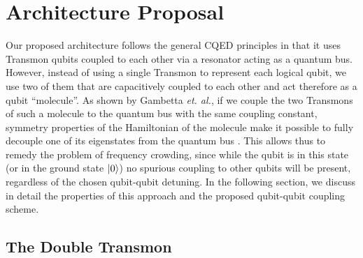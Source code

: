 \section{Architecture Proposal}

Our proposed architecture follows the general CQED principles in that it uses Transmon qubits coupled to each other via a resonator acting as a quantum bus. However, instead of using a single Transmon to represent each logical qubit, we use two of them that are capacitively coupled to each other and act therefore as a qubit ``molecule''. As shown by Gambetta {\it et. al.}, if we couple the two Transmons of such a molecule to the quantum bus with the same coupling constant, symmetry properties of the Hamiltonian of the molecule make it possible to fully decouple one of its eigenstates from the quantum bus \citep{gambetta_superconducting_2011}. This allows thus to remedy the problem of frequency crowding, since while the qubit is in this state (or in the ground state $\left| 0 \right>$) no spurious coupling to other qubits will be present, regardless of the chosen qubit-qubit detuning. In the following section, we discuss in detail the properties of this approach and the proposed qubit-qubit coupling scheme.

\subsection{The Double Transmon} \label{section:double_transmon}

